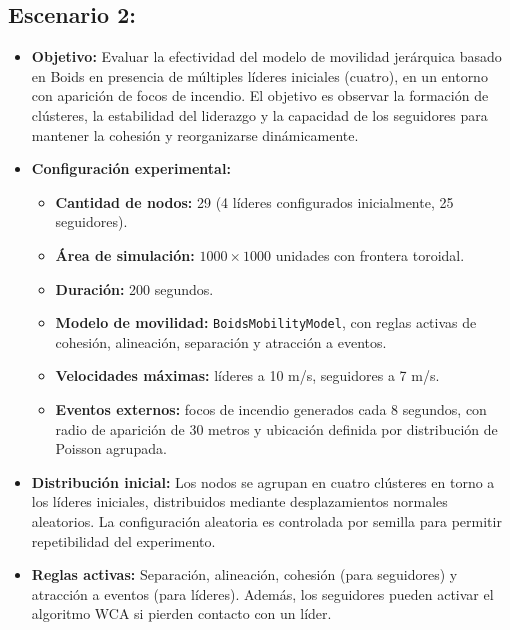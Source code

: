 \documentclass{article}
\begin{document}
\subsection{Escenario 2:}
\begin{itemize}
\item \textbf{Objetivo:} Evaluar la efectividad del modelo de movilidad jerárquica basado en Boids en presencia de múltiples líderes iniciales (cuatro), en un entorno con aparición de focos de incendio. El objetivo es observar la formación de clústeres, la estabilidad del liderazgo y la capacidad de los seguidores para mantener la cohesión y reorganizarse dinámicamente.

\item \textbf{Configuración experimental:}
\begin{itemize}
    \item \textbf{Cantidad de nodos:} 29 (4 líderes configurados inicialmente, 25 seguidores).
    \item \textbf{Área de simulación:} $1000 \times 1000$ unidades con frontera toroidal.
    \item \textbf{Duración:} 200 segundos.
    \item \textbf{Modelo de movilidad:} \texttt{BoidsMobilityModel}, con reglas activas de cohesión, alineación, separación y atracción a eventos.
    \item \textbf{Velocidades máximas:} líderes a 10 m/s, seguidores a 7 m/s.
    \item \textbf{Eventos externos:} focos de incendio generados cada 8 segundos, con radio de aparición de 30 metros y ubicación definida por distribución de Poisson agrupada.
\end{itemize}

\item \textbf{Distribución inicial:}
Los nodos se agrupan en cuatro clústeres en torno a los líderes iniciales, distribuidos mediante desplazamientos normales aleatorios. La configuración aleatoria es controlada por semilla para permitir repetibilidad del experimento.

\item \textbf{Reglas activas:}
Separación, alineación, cohesión (para seguidores) y atracción a eventos (para líderes). Además, los seguidores pueden activar el algoritmo WCA si pierden contacto con un líder.


\end{itemize}
\end{document}
